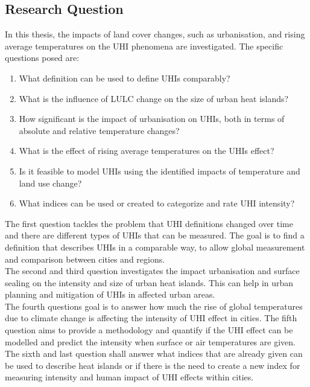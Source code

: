 \documentclass[12pt,a4paper, english,twoside]{article}
\begin{document}
 \subsection{Research Question}
  In this thesis, the impacts of land cover changes, such as urbanisation, and rising average temperatures on the \gls{UHI} phenomena are investigated.
  The specific questions posed are:
  \begin{enumerate}
    \item What definition can be used to define \glspl{UHI} comparably?\label{q1}
    \item What is the influence of \gls{LULC} change on the size of urban heat islands?\label{q2}
    \item How significant is the impact of urbanisation on \glspl{UHI}, both in terms of absolute and relative temperature changes?\label{q3}
    \item What is the effect of rising average temperatures on the \glspl{UHI} effect?\label{q4}
    \item Is it feasible to model \glspl{UHI} using the identified impacts of temperature and land use change?\label{q5}
    \item What indices can be used or created to categorize and rate \gls{UHI} intensity?\label{q6}
  \end{enumerate}
  The first question tackles the problem that \gls{UHI} definitions changed over time and there are different types of \glspl{UHI} that can be measured. The goal is to find a definition that describes \glspl{UHI} in a comparable way, to allow global measurement and comparison between cities and regions.\\ 
  The second and third question investigates the impact urbanisation and surface sealing on the intensity and size of urban heat islands. This can help in urban planning and mitigation of \glspl{UHI} in affected urban areas.\\ %
  The fourth questions goal is to answer how much the rise of global temperatures due to climate change is affecting the intensity of \gls{UHI} effect in cities.%
  The fifth question aims to provide a methodology and quantify if the \gls{UHI} effect can be modelled and predict the intensity when surface or air temperatures are given. 
  The sixth and last question shall answer what indices that are already given can be used to describe heat islands or if there is the need to create a new index for measuring intensity and human impact of \gls{UHI} effects within cities.
\end{document}
